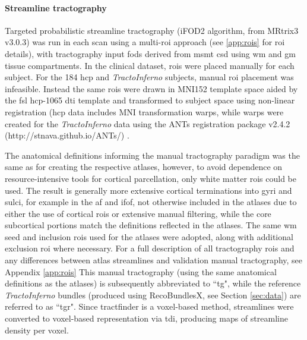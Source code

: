 \paragraph*{Streamline tractography}

Targeted probabilistic streamline tractography (iFOD2 algorithm\autocite{Tournier2010}, from MRtrix3\autocite{Tournier2019} v3.0.3)  was run in each scan using a multi-\gls{roi} approach (see \ref{app:rois} for \gls{roi} details), with tractography input \glspl{fod} derived from \gls{msmt} \gls{csd} \autocite{Jeurissen2014} using \gls{wm} and \gls{gm} tissue compartments.
In the clinical dataset, \glspl{roi} were placed manually for each subject.
For the 184 \gls{hcp} and \textit{TractoInferno} subjects, manual \gls{roi} placement was infeasible.
Instead the same \glspl{roi} were drawn in MNI152 template space aided by the \gls{fsl} \gls{hcp}-1065 \gls{dti} template\autocite{FSLATLAS} and transformed to subject space using non-linear registration
(\gls{hcp} data includes MNI transformation warps, while warps were created for the \textit{TractoInferno} data using the ANTs registration package v2.4.2 (http://stnava.github.io/ANTs/) \autocite{Tustison2013,Avants2011}.

The anatomical definitions informing the manual tractography paradigm was the same as for creating the respective atlases, however, to avoid dependence on resource-intensive tools for cortical parcellation, only white matter \glspl{roi} could be used.
The result is generally more extensive cortical terminations into gyri and sulci, for example in the \gls{af} and \gls{ifof}, not otherwise included in the atlases due to either the use of cortical \glspl{roi} or extensive manual filtering, while the core subcortical portions match the definitions reflected in the atlases.
The same \gls{wm} seed and inclusion \glspl{roi} used for the atlases were adopted, along with additional exclusion \gls{roi} where necessary.
For a full description of all tractography \glspl{roi} and any differences between atlas streamlines and validation manual tractography, see Appendix \ref{app:rois}
This manual tractography (using the same anatomical definitions as the atlases) is subsequently abbreviated to ``\gls{tg}", while the reference \textit{TractoInferno} bundles (produced using RecoBundlesX, see Section \ref{sec:data}) are referred to as ``\gls{tgr}".
Since tractfinder is a voxel-based method, streamlines were converted to voxel-based representation via \gls{tdi}\autocite{Calamante2010}, producing maps of streamline density per voxel.

